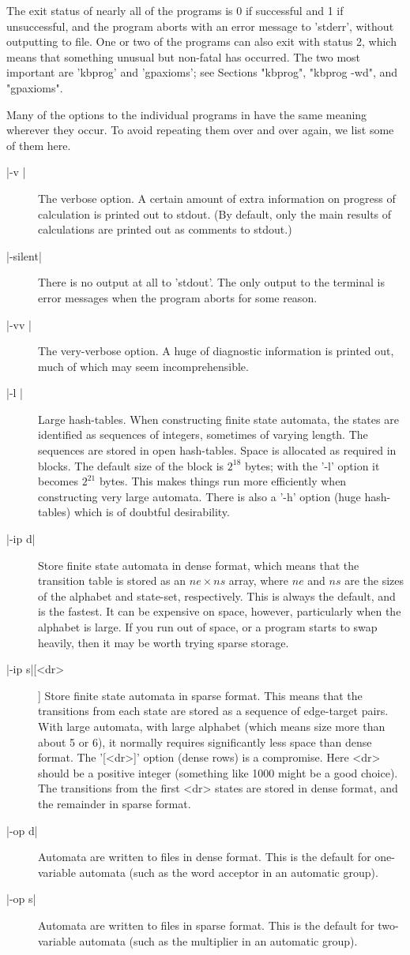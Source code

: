 The exit status of nearly all of the programs is 0 if successful and
1 if unsuccessful, and the program aborts with an error message
to 'stderr', without outputting to file.
One or two of the programs can also exit with status 2, which means that
something unusual but non-fatal has occurred. The two most important are
'kbprog' and 'gpaxioms'; see Sections "kbprog", "kbprog -wd", and
"gpaxioms".

Many of the options to the individual programs in {\KBMAG} have the same
meaning wherever they occur. To avoid repeating them over and over again, we
list some of them here.
\begin{description}
\item[|-v |]
The verbose option. A certain amount of extra information on progress of
calculation is printed out to stdout.
(By default, only the main results of calculations are printed out as
comments to stdout.)
\item[|-silent|]
There is no output at all to 'stdout'.
The only output to the terminal is error messages when the program
aborts for some reason.
\item[|-vv |]
The very-verbose option. A huge of diagnostic information is printed out,
much of which may seem incomprehensible.
\item[|-l |]
Large hash-tables. When constructing finite state automata, the states
are identified as sequences of integers, sometimes of varying length.
The sequences are stored in open hash-tables. Space is allocated as
required in blocks. The default size of the block is $2^{18}$ bytes;
with the '-l' option it becomes $2^{21}$ bytes. This makes things
run more efficiently when constructing very large automata.
There is also a '-h' option (huge hash-tables) which is of doubtful
desirability.
\item[|-ip d|]
Store finite state automata in dense format, which means that the
transition table is stored as an $ne \times ns$ array, where $ne$ and
$ns$ are the sizes of the alphabet  and state-set, respectively.
This is always the default, and is the fastest. It can be expensive on
space, however, particularly when the alphabet is large. If you run out
of space, or a program starts to swap heavily, then it may be worth trying
sparse storage.
\item[|-ip s|[<dr>]]
Store finite state automata in sparse format. This means that the
transitions from each state are stored as a sequence of edge-target
pairs. With large automata, with large alphabet (which means size more
than about 5 or 6), it normally requires significantly less space than
dense format. The '[<dr>]' option (dense rows) is a compromise.
Here <dr> should be a positive integer (something like 1000 might be a good
choice). The transitions from the first <dr> states are stored in dense
format, and the remainder in sparse format.
\item[|-op d|]
Automata are written to files in dense format. This is the default
for one-variable automata (such as the word acceptor in an automatic
group).
\item[|-op s|]
Automata are written to files in sparse format. This is the default
for two-variable automata (such as the multiplier in an automatic
group).
\end{description}
